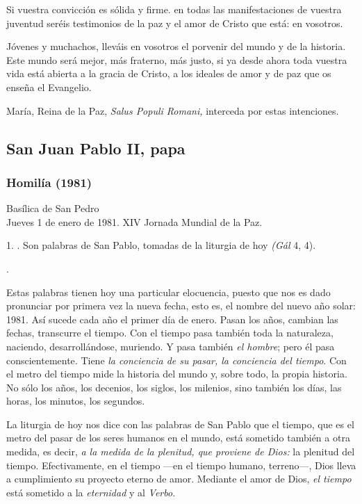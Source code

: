 \begin{body}
\begin{body}
Si vuestra convicción es sólida y firme. en todas las manifestaciones de vuestra juventud seréis testimonios de la paz y el amor de Cristo que está: en vosotros.

Jóvenes y muchachos, lleváis en vosotros el porvenir del mundo y de la historia. Este mundo será mejor, más fraterno, más justo, si ya desde ahora toda vuestra vida está abierta a la gracia de Cristo, a los ideales de amor y de paz que os enseña el Evangelio.

María, Reina de la Paz, \emph{Salus Populi Romani,} interceda por estas intenciones.

\subsection{San Juan Pablo II, papa}

\subsubsection{Homilía (1981)}

Basílica de San Pedro\\ Jueves 1 de enero de 1981. XIV Jornada Mundial de la Paz.


1. . Son palabras de San Pablo, tomadas de la liturgia de hoy \emph{(Gál} 4, 4).

\emph{}.

Estas palabras tienen hoy una particular elocuencia, puesto que nos es dado pronunciar por primera vez la nueva fecha, esto es, el nombre del nuevo año solar: 1981. Así sucede cada año el primer día de enero. Pasan los años, cambian las fechas, transcurre el tiempo. Con el tiempo pasa también toda la naturaleza, naciendo, desarrollándose, muriendo. Y pasa también \emph{el hombre}; pero él pasa conscientemente. Tiene \emph{la conciencia de su pasar, la conciencia del tiempo}. Con el metro del tiempo mide la historia del mundo y, sobre todo, la propia historia. No sólo los años, los decenios, los siglos, los milenios, sino también los días, las horas, los minutos, los segundos.

La liturgia de hoy nos dice con las palabras de San Pablo que el tiempo, que es el metro del pasar de los seres humanos en el mundo, está sometido también a otra medida, es decir, \emph{a la medida de la plenitud, que proviene de Dios:} la plenitud del tiempo. Efectivamente, en el tiempo ---en el tiempo humano, terreno---, Dios lleva a cumplimiento su proyecto eterno de amor. Mediante el amor de Dios, \emph{el tiempo} está sometido a la \emph{eternidad} y al \emph{Verbo}.


\end{body}
\end{body}
